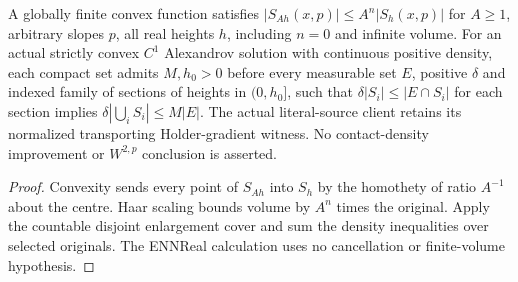 \begin{lemma}
  \label{lem:convex-section-weak-type}
  \leanok
  A globally finite convex function satisfies $|S_{Ah}(x,p)|\le A^n|S_h(x,p)|$
  for $A\ge1$, arbitrary slopes $p$, all real heights $h$, including $n=0$ and
  infinite volume. For an actual strictly convex $C^1$ Alexandrov solution with
  continuous positive density, each compact set admits $M,h_0>0$ before every
  measurable set $E$, positive $\delta$ and indexed family of sections of heights
  in $(0,h_0]$, such that $\delta|S_i|\le|E\cap S_i|$ for each section implies
  $\delta|\bigcup_i S_i|\le M|E|$. The actual literal-source client retains its
  normalized transporting Holder-gradient witness. No contact-density improvement
  or $W^{2,p}$ conclusion is asserted.
\end{lemma}
\begin{proof}
  \leanok
  Convexity sends every point of $S_{Ah}$ into $S_h$ by the homothety of ratio
  $A^{-1}$ about the centre. Haar scaling bounds volume by $A^n$ times the original.
  Apply the countable disjoint enlargement cover and sum the density inequalities
  over selected originals. The ENNReal calculation uses no cancellation or
  finite-volume hypothesis.
\end{proof}


